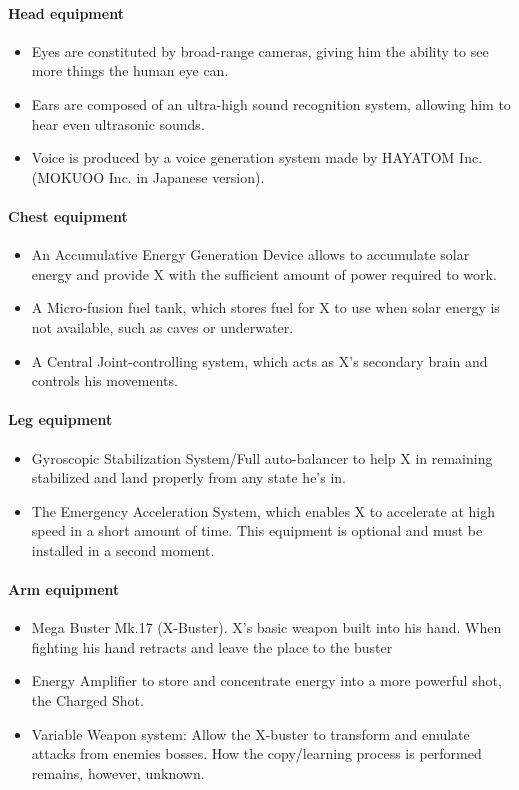 \paragraph{Head equipment}
\begin{itemize}
	\item Eyes are constituted by broad-range cameras, giving him the ability to see more things the human eye can.
	\item Ears are composed of an ultra-high sound recognition system, allowing him to hear even ultrasonic sounds.
	\item Voice is produced by a voice generation system made by HAYATOM Inc. (MOKUOO Inc. in Japanese version). 
\end{itemize}

\paragraph{Chest equipment}
\begin{itemize}
	\item An Accumulative Energy Generation Device allows to accumulate solar energy and provide X with the sufficient amount of power required to work.
	\item A Micro-fusion fuel tank, which stores fuel for X to use when solar energy is not available, such as caves or underwater.
	\item A Central Joint-controlling system, which acts as X's secondary brain and controls his movements.
\end{itemize}

\paragraph{Leg equipment}
\begin{itemize}
	\item Gyroscopic Stabilization System/Full auto-balancer to help X in remaining stabilized and land properly from any state he's in.
	\item The Emergency Acceleration System, which enables X to accelerate at high speed in a short amount of time. This equipment is optional and must be installed in a second moment.
\end{itemize}

\paragraph{Arm equipment}
\begin{itemize}
	\item Mega Buster Mk.17 (X-Buster). X’s basic weapon built into his hand. When fighting his hand retracts and leave the place to the buster~\cite{elysium_weapons}
	\item Energy Amplifier to store and concentrate energy into a more powerful shot, the Charged Shot.
	\item Variable Weapon system: Allow the X-buster to transform and emulate attacks from enemies bosses. How the copy/learning process is performed remains, however, unknown.
\end{itemize}


